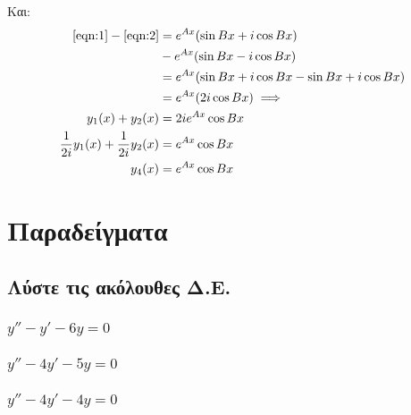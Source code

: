 \documentclass[12pt]{extarticle}
\begin{document}
Και:
\begin{equation*}
    \begin{aligned}
        \eqref{eqn:1} - \eqref{eqn:2}               & = e^{Ax} (\sin{Bx} + i \cos{Bx})                         \\
                                                    & - e^{Ax} (\sin{Bx} - i \cos{Bx})                         \\
                                                    & = e^{Ax} (\sin{Bx} + i \cos{Bx} - \sin{Bx} + i \cos{Bx}) \\
                                                    & = e^{Ax} (2 i \cos{Bx}) \implies                         \\
        y_1(x) + y_2(x)                             & = 2 i e^{Ax} \cos{Bx}                                    \\
        \frac{1}{2 i} y_1(x) + \frac{1}{2 i} y_2(x) & = e^{Ax} \cos{Bx}                                        \\
        y_4(x)                                      & = e^{Ax} \cos{Bx}
    \end{aligned}
\end{equation*}
\section{Παραδείγματα}
\subsection{Λύστε τις ακόλουθες Δ.Ε.}
\subsubsection{\( y''  -y' - 6y = 0 \)}
\subsubsection{\( y'' -4y' - 5y = 0 \)}
\subsubsection{\( y'' -4y' - 4y = 0 \)}
\end{document}
